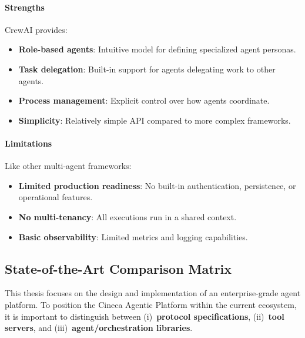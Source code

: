 \paragraph{Strengths}
CrewAI provides:
\begin{itemize}
    \item \textbf{Role-based agents}: Intuitive model for defining specialized agent personas.
    \item \textbf{Task delegation}: Built-in support for agents delegating work to other agents.
    \item \textbf{Process management}: Explicit control over how agents coordinate.
    \item \textbf{Simplicity}: Relatively simple API compared to more complex frameworks.
\end{itemize}

\paragraph{Limitations}
Like other multi-agent frameworks:
\begin{itemize}
    \item \textbf{Limited production readiness}: No built-in authentication, persistence, or operational features.
    \item \textbf{No multi-tenancy}: All executions run in a shared context.
    \item \textbf{Basic observability}: Limited metrics and logging capabilities.
\end{itemize}


\subsection{State-of-the-Art Comparison Matrix}

This thesis focuses on the design and implementation of an enterprise-grade agent platform.
To position the Cineca Agentic Platform within the current ecosystem, it is important to
distinguish between (i) \,\textbf{protocol specifications}, (ii) \,\textbf{tool servers},
and (iii) \,\textbf{agent/orchestration libraries}.

